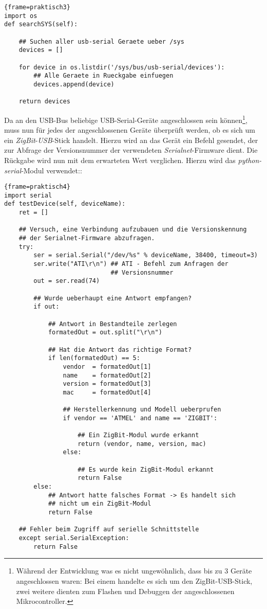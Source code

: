 \begin{lstlisting}{frame=praktisch3}
import os
def searchSYS(self):

    ## Suchen aller usb-serial Geraete ueber /sys 
    devices = []

    for device in os.listdir('/sys/bus/usb-serial/devices'):
        ## Alle Geraete in Rueckgabe einfuegen
        devices.append(device)

    return devices
\end{lstlisting}

Da an den USB-Bus beliebige USB-Serial-Geräte angeschlossen sein können\footnote{Während der Entwicklung
was es nicht ungewöhnlich, dass bis zu 3 Geräte angeschlossen waren: Bei einem handelte es sich um den
ZigBit-USB-Stick, zwei weitere dienten zum Flashen und Debuggen der angeschlossenen Mikrocontroller.}, 
muss nun für jedes der angeschlossenen Geräte überprüft werden, ob es sich um ein \emph{ZigBit}-\emph{USB}-Stick
handelt. Hierzu wird an das Gerät ein Befehl gesendet, der zur Abfrage der Versionsnummer der verwendeten
\emph{Serialnet}-Firmware dient. Die Rückgabe wird nun mit dem erwarteten Wert verglichen. Hierzu wird das
\emph{python-serial}-Modul verwendet::

\begin{lstlisting}{frame=praktisch4}
import serial
def testDevice(self, deviceName):
    ret = []

    ## Versuch, eine Verbindung aufzubauen und die Versionskennung
    ## der Serialnet-Firmware abzufragen. 
    try:
        ser = serial.Serial("/dev/%s" % deviceName, 38400, timeout=3)
        ser.write("ATI\r\n") ## ATI - Befehl zum Anfragen der
                             ## Versionsnummer
        out = ser.read(74)
        
        ## Wurde ueberhaupt eine Antwort empfangen? 
        if out:

            ## Antwort in Bestandteile zerlegen
            formatedOut = out.split("\r\n")

            ## Hat die Antwort das richtige Format?
            if len(formatedOut) == 5:
                vendor  = formatedOut[1]
                name    = formatedOut[2]
                version = formatedOut[3]
                mac     = formatedOut[4]

                ## Herstellerkennung und Modell ueberprufen
                if vendor == 'ATMEL' and name == 'ZIGBIT':

                    ## Ein ZigBit-Modul wurde erkannt
                    return (vendor, name, version, mac)
                else:

                    ## Es wurde kein ZigBit-Modul erkannt
                    return False
        else:
            ## Antwort hatte falsches Format -> Es handelt sich
            ## nicht um ein ZigBit-Modul
            return False

    ## Fehler beim Zugriff auf serielle Schnittstelle
    except serial.SerialException:
        return False
\end{lstlisting}

